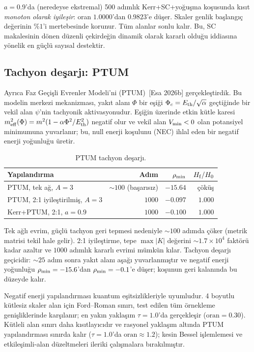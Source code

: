 $a = 0.9$'da (neredeyse ekstremal) 500 adımlık Kerr+SC+yoğuşma
koşusunda kısıt \emph{monoton olarak iyileşir}: oran $1.0000$'dan
$0.9823$'e düşer. Skaler genlik başlangıç değerinin $\%1$'i
mertebesinde korunur. Tüm alanlar sonlu kalır. Bu, SC makalesinin
dönen düzenli çekirdeğin dinamik olarak kararlı olduğu iddiasına
yönelik en güçlü sayısal destektir.

\subsection{Tachyon deşarjı: PTUM}

Ayrıca Faz Geçişli Evrenler Modeli'ni (PTUM)~[Esa 2026b]
gerçekleştirdik. Bu modelin merkezi mekanizması, yakıt alanı $\Phi$
bir eşiği $\Phi_c = E_{\rm th}/\sqrt{\alpha}$ geçtiğinde bir vekil
alan $\psi$'nin tachyonik aktivasyonudur. Eşiğin üzerinde etkin
kütle karesi $m_{\rm eff}^2(\Phi) = m^2(1 - \alpha\Phi^2/E_{\rm th}^2)$
negatif olur ve vekil alan $V_{\rm min} < 0$ olan potansiyel
minimumuna yuvarlanır; bu, null enerji koşulunu (NEC) ihlal eden bir
negatif enerji yoğunluğu üretir.

\begin{table}[t]
\centering
\caption{PTUM tachyon deşarjı.}
\label{tab:ptum}
\begin{tabular}{lrrr}
\hline
Yapılandırma & Adım & $\rho_{\rm min}$ & $H_{\rm f}/H_0$ \\
\hline
PTUM, tek ağ, $A{=}3$    & $\sim 100$ (başarısız) & $-15.64$ & çöküş \\
PTUM, 2:1 iyileştirilmiş, $A{=}3$ & $1000$ & $-0.097$ & $1.000$ \\
Kerr+PTUM, 2:1, $a{=}0.9$ & $1000$ & $-0.100$ & $1.000$ \\
\hline
\end{tabular}
\end{table}

Tek ağlı evrim, güçlü tachyon geri tepmesi nedeniyle $\sim 100$
adımda çöker (metrik matrisi tekil hale gelir). 2:1 iyileştirme, tepe
$\max|K|$ değerini $\sim 1.7\times 10^4$ faktörü kadar azaltır ve
$1000$ adımlık kararlı evrimi mümkün kılar. Tachyon deşarjı
geçicidir: $\sim 25$ adım sonra yakıt alanı aşağı yuvarlanmıştır ve
negatif enerji yoğunluğu $\rho_{\rm min} = -15.6$'dan
$\rho_{\rm min} = -0.1$'e düşer; koşunun geri kalanında bu düzeyde
kalır.

Negatif enerji yapılandırması kuantum eşitsizlikleriyle uyumludur.
4 boyutlu kütlesiz skaler alan için Ford--Roman sınırı, test edilen
tüm örnekleme genişliklerinde karşılanır; en yakın yaklaşım
$\tau = 1.0$'da gerçekleşir ($\text{oran} = 0.30$). Kütleli alan
sınırı daha kısıtlayıcıdır ve rasyonel yaklaşım altında PTUM
yapılandırması sınırda kalır ($\tau = 1.0$'da
$\text{oran} \approx 1.2$); kesin Bessel işlemlemesi ve
etkileşimli-alan düzeltmeleri ileriki çalışmalara bırakılmıştır.


